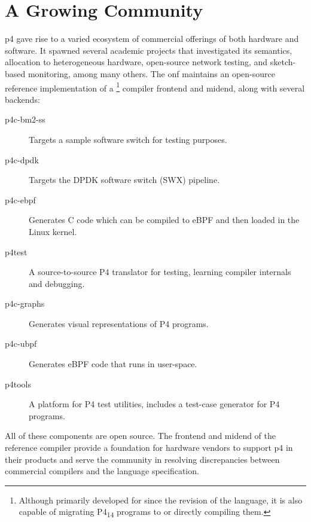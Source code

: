 \section*{A Growing Community}

\acrshort{p4} gave rise to a varied ecosystem of commercial offerings of both
hardware and software. It spawned several academic projects that investigated
its semantics\cite{doenges2021petr4}, allocation to heterogeneous
hardware\cite{sultana2021flightplan}, open-source network
testing\cite{antichi2014osnt}, and sketch-based
monitoring\cite{namkung2022sketchlib}, among many
others\cite{liatifis2023advancingp4survey}. The \acrfull{onf}
maintains\cite{p4onf} an open-source reference implementation of a
\pfs\footnote{Although primarily developed for \pfs since the revision of the
language, it is also capable of migrating P4\textsubscript{14} programs to \pfs
or directly compiling them.} compiler frontend and mid\-end, along with several
backends:

\begin{description}
	\item[p4c-bm2-ss] Targets a sample software switch for testing purposes.
	\item[p4c-dpdk] Targets the DPDK software switch (SWX) pipeline\cite{dpdkDPDKRelease}.
	\item[p4c-ebpf] Generates C code which can be compiled to eBPF
		and then loaded in the Linux kernel.
	\item[p4test] A source-to-source P4 translator for testing, learning compiler
		internals and debugging.
	\item[p4c-graphs] Generates visual representations of P4 programs.
	\item[p4c-ubpf] Generates eBPF code that runs in user-space.
	\item[p4tools] A platform for P4 test utilities, includes a test-case
		generator for P4 programs.
\end{description}

All of these components are open source. The frontend and mid\-end of the
reference compiler provide a foundation for hardware vendors to support
\acrshort{p4} in their products and serve the community in resolving
discrepancies between commercial compilers and the language specification.

